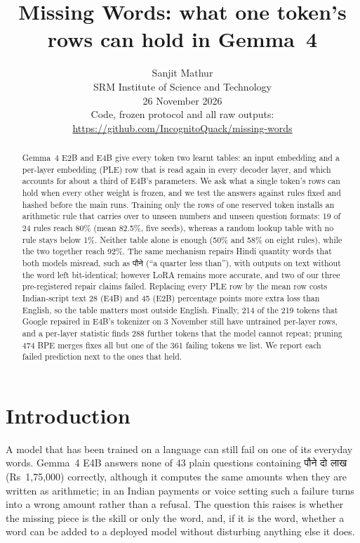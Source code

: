 \documentclass[10pt]{article}
\title{\vspace{-1.2em}\textbf{Missing Words: what one token's rows can hold in Gemma~4}}
\author{Sanjit Mathur\\\small SRM Institute of Science and Technology\\\small 26 November 2026\\\small Code, frozen protocol and all raw outputs: \url{https://github.com/IncognitoQuack/missing-words}}
\date{\vspace{-1.5em}}
\begin{document}
\maketitle

\begin{abstract}\noindent
Gemma~4 E2B and E4B give every token two learnt tables: an input embedding and a per-layer embedding (PLE) row that is read again in every decoder layer, and which accounts for about a third of E4B's parameters. We ask what a single token's rows can hold when every other weight is frozen, and we test the answers against rules fixed and hashed before the main runs. Training only the rows of one reserved token installs an arithmetic rule that carries over to unseen numbers and unseen question formats: 19 of 24 rules reach 80\% (mean 82.5\%, five seeds), whereas a random lookup table with no rule stays below 1\%. Neither table alone is enough (50\% and 58\% on eight rules), while the two together reach 92\%. The same mechanism repairs Hindi quantity words that both models misread, such as {\deva पौने} (``a quarter less than''), with outputs on text without the word left bit-identical; however LoRA remains more accurate, and two of our three pre-registered repair claims failed. Replacing every PLE row by the mean row costs Indian-script text 28 (E4B) and 45 (E2B) percentage points more extra loss than English, so the table matters most outside English. Finally, 214 of the 219 tokens that Google repaired in E4B's tokenizer on 3 November still have untrained per-layer rows, and a per-layer statistic finds 288 further tokens that the model cannot repeat; pruning 474 BPE merges fixes all but one of the 361 failing tokens we list. We report each failed prediction next to the ones that held.
\end{abstract}

\section{Introduction}
A model that has been trained on a language can still fail on one of its everyday words. Gemma~4 E4B answers none of 43 plain questions containing {\deva पौने दो लाख} (Rs~1,75,000) correctly, although it computes the same amounts when they are written as arithmetic; in an Indian payments or voice setting such a failure turns into a wrong amount rather than a refusal. The question this raises is whether the missing piece is the skill or only the word, and, if it is the word, whether a word can be added to a deployed model without disturbing anything else it does.
\end{document}
